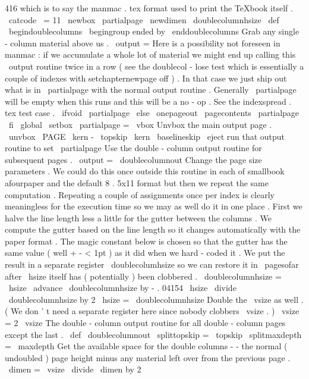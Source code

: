 {{416
which
is
to
say
%
the
manmac
.
tex
format
used
to
print
the
TeXbook
itself
.
\
catcode
\
=
11
\
newbox
\
partialpage
\
newdimen
\
doublecolumnhsize
\
def
\
begindoublecolumns
{
\
begingroup
%
ended
by
\
enddoublecolumns
%
Grab
any
single
-
column
material
above
us
.
\
output
=
{
%
%
%
Here
is
a
possibility
not
foreseen
in
manmac
:
if
we
accumulate
a
%
whole
lot
of
material
we
might
end
up
calling
this
\
output
%
routine
twice
in
a
row
(
see
the
doublecol
-
lose
test
which
is
%
essentially
a
couple
of
indexes
with
setchapternewpage
off
)
.
In
%
that
case
we
just
ship
out
what
is
in
\
partialpage
with
the
normal
%
output
routine
.
Generally
\
partialpage
will
be
empty
when
this
%
runs
and
this
will
be
a
no
-
op
.
See
the
indexspread
.
tex
test
case
.
\
ifvoid
\
partialpage
\
else
\
onepageout
{
\
pagecontents
\
partialpage
}
%
\
fi
%
\
global
\
setbox
\
partialpage
=
\
vbox
{
%
%
Unvbox
the
main
output
page
.
\
unvbox
\
PAGE
\
kern
-
\
topskip
\
kern
\
baselineskip
}
%
}
%
\
eject
%
run
that
output
routine
to
set
\
partialpage
%
%
Use
the
double
-
column
output
routine
for
subsequent
pages
.
\
output
=
{
\
doublecolumnout
}
%
%
%
Change
the
page
size
parameters
.
We
could
do
this
once
outside
this
%
routine
in
each
of
smallbook
afourpaper
and
the
default
8
.
5x11
%
format
but
then
we
repeat
the
same
computation
.
Repeating
a
couple
%
of
assignments
once
per
index
is
clearly
meaningless
for
the
%
execution
time
so
we
may
as
well
do
it
in
one
place
.
%
%
First
we
halve
the
line
length
less
a
little
for
the
gutter
between
%
the
columns
.
We
compute
the
gutter
based
on
the
line
length
so
it
%
changes
automatically
with
the
paper
format
.
The
magic
constant
%
below
is
chosen
so
that
the
gutter
has
the
same
value
(
well
+
-
<
1pt
)
%
as
it
did
when
we
hard
-
coded
it
.
%
%
We
put
the
result
in
a
separate
register
\
doublecolumhsize
so
we
%
can
restore
it
in
\
pagesofar
after
\
hsize
itself
has
(
potentially
)
%
been
clobbered
.
%
\
doublecolumnhsize
=
\
hsize
\
advance
\
doublecolumnhsize
by
-
.
04154
\
hsize
\
divide
\
doublecolumnhsize
by
2
\
hsize
=
\
doublecolumnhsize
%
%
Double
the
\
vsize
as
well
.
(
We
don
'
t
need
a
separate
register
here
%
since
nobody
clobbers
\
vsize
.
)
\
vsize
=
2
\
vsize
}
%
The
double
-
column
output
routine
for
all
double
-
column
pages
except
%
the
last
.
%
\
def
\
doublecolumnout
{
%
\
splittopskip
=
\
topskip
\
splitmaxdepth
=
\
maxdepth
%
Get
the
available
space
for
the
double
columns
-
-
the
normal
%
(
undoubled
)
page
height
minus
any
material
left
over
from
the
%
previous
page
.
\
dimen
=
\
vsize
\
divide
\
dimen
by
2
}}}
